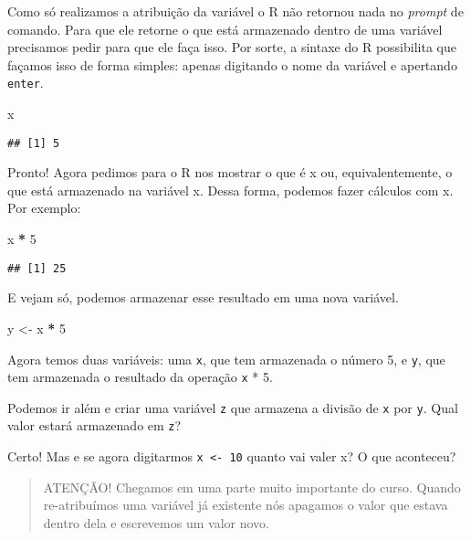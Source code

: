\documentclass[]{book}
\newenvironment{Shaded}{\begin{snugshade}}{\end{snugshade}}
\newcommand{\DecValTok}[1]{\textcolor[rgb]{0.00,0.00,0.81}{#1}}
\newcommand{\NormalTok}[1]{#1}
\newcommand{\OperatorTok}[1]{\textcolor[rgb]{0.81,0.36,0.00}{\textbf{#1}}}
\newcommand{\StringTok}[1]{\textcolor[rgb]{0.31,0.60,0.02}{#1}}
\theoremstyle{definition}
\theoremstyle{definition}
\theoremstyle{definition}
\theoremstyle{remark}
\begin{document}
Como só realizamos a atribuição da variável o R não retornou nada no \emph{prompt} de comando. Para que ele retorne o que está armazenado dentro de uma variável precisamos pedir para que ele faça isso. Por sorte, a sintaxe do R possibilita que façamos isso de forma simples: apenas digitando o nome da variável e apertando \texttt{enter}.

\begin{Shaded}
\begin{Highlighting}[]
\NormalTok{x}
\end{Highlighting}
\end{Shaded}

\begin{verbatim}
## [1] 5
\end{verbatim}

Pronto! Agora pedimos para o R nos mostrar o que é x ou, equivalentemente, o que está armazenado na variável x.
Dessa forma, podemos fazer cálculos com x. Por exemplo:

\begin{Shaded}
\begin{Highlighting}[]
\NormalTok{x }\OperatorTok{*}\StringTok{ }\DecValTok{5}
\end{Highlighting}
\end{Shaded}

\begin{verbatim}
## [1] 25
\end{verbatim}

E vejam só, podemos armazenar esse resultado em uma nova variável.

\begin{Shaded}
\begin{Highlighting}[]
\NormalTok{y <-}\StringTok{ }\NormalTok{x }\OperatorTok{*}\StringTok{ }\DecValTok{5}
\end{Highlighting}
\end{Shaded}

Agora temos duas variáveis: uma \texttt{x}, que tem armazenada o número 5, e \texttt{y}, que tem armazenada o resultado da operação \texttt{x} * 5.

Podemos ir além e criar uma variável \texttt{z} que armazena a divisão de \texttt{x} por \texttt{y}. Qual valor estará armazenado em \texttt{z}?

Certo! Mas e se agora digitarmos \texttt{x\ \textless{}-\ 10} quanto vai valer x? O que aconteceu?

\begin{quote}
ATENÇÃO! Chegamos em uma parte muito importante do curso. Quando re-atribuímos uma variável já existente nós apagamos o valor que estava dentro dela e escrevemos um valor novo.
\end{quote}
\end{document}
